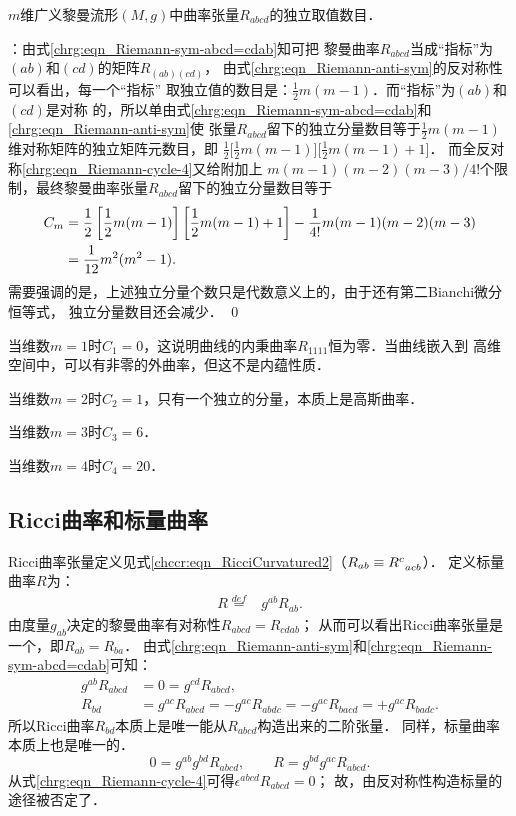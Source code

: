 \begin{example}
    $m$维广义黎曼流形$(M,g)$中曲率张量$R_{abcd}$的独立取值数目．
\end{example}
：由式\eqref{chrg:eqn_Riemann-sym-abcd=cdab}知可把
黎曼曲率$R_{abcd}$当成“指标”为$(ab)$和$(cd)$的矩阵$R_{(ab)(cd)}$，
由式\eqref{chrg:eqn_Riemann-anti-sym}的反对称性可以看出，每一个“指标”
取独立值的数目是：$\frac{1}{2}m(m-1)$．而“指标”为$(ab)$和$(cd)$是对称
的，所以单由式\eqref{chrg:eqn_Riemann-sym-abcd=cdab}和\eqref{chrg:eqn_Riemann-anti-sym}使
张量$R_{abcd}$留下的独立分量数目等于$\frac{1}{2}m(m-1)$维对称矩阵的独立矩阵元数目，即
$\frac{1}{2}\bigl[\frac{1}{2}m(m-1)\bigr] \bigl[\frac{1}{2}m(m-1)+1\bigr]$．
而全反对称\eqref{chrg:eqn_Riemann-cycle-4}又给附加上
$m(m-1)(m-2)(m-3)/4!$个限制，最终黎曼曲率张量$R_{abcd}$留下的独立分量数目等于
\begin{align}
    C_m &= \frac{1}{2}\left[\frac{1}{2}m(m-1)\right] \left[\frac{1}{2}m(m-1)+1\right]
             - \frac{1}{4!}m(m-1)(m-2)(m-3)  \notag\\
      &= \frac{1}{12} m^2(m^2-1) . \label{chrg:eqn_Number-Of-Riemannd4}
\end{align}
需要强调的是，上述独立分量个数只是代数意义上的，由于还有第二Bianchi微分恒等式，
独立分量数目还会减少． \qed

当维数$m=1$时$C_1=0$，这说明曲线的内秉曲率$R_{1111}$恒为零．当曲线嵌入到
高维空间中，可以有非零的外曲率，但这不是内蕴性质． %

当维数$m=2$时$C_2=1$，只有一个独立的分量，本质上是高斯曲率． 

当维数$m=3$时$C_3=6$．

当维数$m=4$时$C_4=20$．



\subsection{Ricci曲率和标量曲率}
Ricci曲率张量定义见式\eqref{chccr:eqn_RicciCurvatured2}（$R_{ab}\equiv R^c_{\hphantom{a}acb}$）．
定义标量曲率$R$为：
\begin{align}
    R \overset{def}{=}& g^{ab} R_{ab}. \label{chrg:eqn_ScalarCurvature}
\end{align}
由度量$g_{ab}$决定的黎曼曲率有对称性$R_{abcd}=R_{cdab}$；
从而可以看出Ricci曲率张量是一个，即$R_{ab}=R_{ba}$．
由式\eqref{chrg:eqn_Riemann-anti-sym}和\eqref{chrg:eqn_Riemann-sym-abcd=cdab}可知：
\begin{align*}
    g^{ab}R_{abcd} &=0= g^{cd}R_{abcd}, \\
    R_{bd} & = g^{ac}R_{abcd} = -g^{ac}R_{abdc} = -g^{ac}R_{bacd} = + g^{ac}R_{badc} .
\end{align*}
所以Ricci曲率$R_{bd}$本质上是唯一能从$R_{abcd}$构造出来的二阶张量．
同样，标量曲率本质上也是唯一的．
\begin{equation*}
    0 = g^{ab} g^{bd}R_{abcd}, \qquad     R  = g^{bd} g^{ac}R_{abcd} .
\end{equation*}
从式\eqref{chrg:eqn_Riemann-cycle-4}可得$\epsilon^{abcd}R_{abcd} =0$；
故，由反对称性构造标量的途径被否定了．




